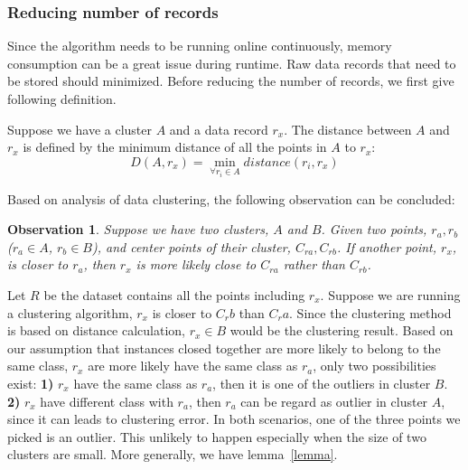 \documentclass[runningheads]{llncs}
\newtheorem{observation}{Observation}
\begin{document}
	\subsubsection{Reducing number of records}
	Since the algorithm needs to be running online continuously, memory consumption can be a great issue during runtime. Raw data records that need to be stored should minimized. Before reducing the number of records, we first give following definition.
	
	\begin{definition}
		
		Suppose we have a cluster $A$ and a data record $r_x$. The distance between $A$ and $r_x$ is defined by the minimum distance of all the points in $A$ to $r_x$:
		\begin{displaymath}
		D(A, r_x) = \min_{\forall r_i \in A} distance(r_i, r_x) 
		\end{displaymath}
	\end{definition}
	
	Based on analysis of data clustering, the following observation can be concluded:
	
	\begin{observation} \label{observation}
		Suppose we have two clusters, $A$ and $B$. Given two points, $r_a, r_b$ ($r_a \in A$, $r_b \in B$), and center points of their cluster, $C_{ra}, C_{rb}$. If another point, $r_x$, is closer to $r_a$, then $r_x$ is more likely close to $C_{ra}$ rather than $C_{rb}$.
	\end{observation}
	
	Let $R$ be the dataset contains all the points including $r_x$. Suppose we are running a clustering algorithm, $r_x$ is closer to $C_rb$ than $C_ra$. Since the clustering method is based on distance calculation, $r_x \in B$ would be the clustering result. Based on our assumption that instances closed together are more likely to belong to the same class, $r_x$ are more likely have the same class as $r_a$, only two possibilities exist: \textbf{1)} $r_x$ have the same class as $r_a$, then it is one of the outliers in cluster $B$. \textbf{2)} $r_x$ have different class with $r_a$, then $r_a$ can be regard as outlier in cluster $A$, since it can leads to clustering error. In both scenarios, one of the three points we picked is an outlier. This unlikely to happen especially when the size of two clusters are small. More generally, we have lemma~\ref{lemma}.
	
\end{document}
